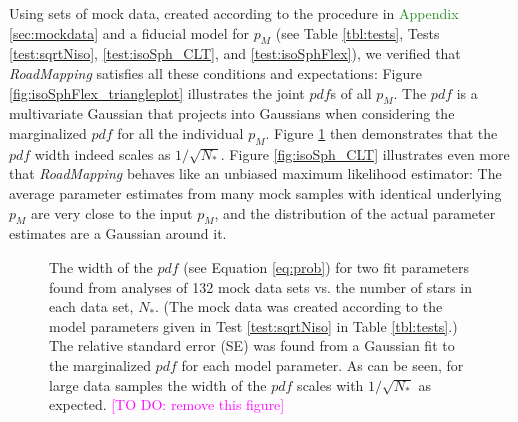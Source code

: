 \documentclass[iop,revtex4]{emulateapj}
\newcommand{\pdf}{\ensuremath{pdf}}
\newcommand{\pmodel}{\ensuremath{p_M}}
\newcommand{\RM}{{\sl RoadMapping}}
\newcommand{\NEW}[1]{\textcolor{ForestGreen}{#1}}
\newcommand{\Wilma}[1]{\textcolor{Magenta}{#1}}
\newcommand{\OLD}[1]{}
\begin{document}
Using sets of mock data, created according to the procedure in \OLD{Section}\NEW{Appendix} \ref{sec:mockdata} and a fiducial model for \pmodel{} (see Table \ref{tbl:tests}, Tests \ref{test:sqrtNiso}, \ref{test:isoSph_CLT}, and \ref{test:isoSphFlex}), we verified that \RM{} satisfies all these conditions and expectations: Figure \ref{fig:isoSphFlex_triangleplot} illustrates the joint \pdf{}s of all \pmodel{}. The \pdf{} is a multivariate Gaussian that projects into Gaussians when considering the marginalized \pdf{} for all the individual \pmodel{}. Figure \ref{fig:sqrtNiso} then demonstrates that the \pdf{} width indeed scales as $1/\sqrt{N_{*}}$. Figure \ref{fig:isoSph_CLT} illustrates even more that \RM{} behaves like an unbiased maximum likelihood estimator: The average parameter estimates from many mock samples with identical underlying \pmodel{} are very close to the input \pmodel{}, and the distribution of the actual parameter estimates are a Gaussian around it. 

\begin{figure}[!htbp]
\caption{The width of the \pdf{} (see Equation \eqref{eq:prob}) for two fit parameters found from analyses of 132 mock data sets vs. the number of stars in each data set, $N_{*}$. (The mock data was created according to the model parameters given in Test \ref{test:sqrtNiso} in Table \ref{tbl:tests}.) The relative standard error (SE) was found from a Gaussian fit to the marginalized \pdf{} for each model parameter. As can be seen, for large data samples the width of the \pdf{} scales with $1/\sqrt{N_{*}}$ as expected. \Wilma{[TO DO: remove this figure]}} 
\label{fig:sqrtNiso}
\end{figure}
\end{document}

